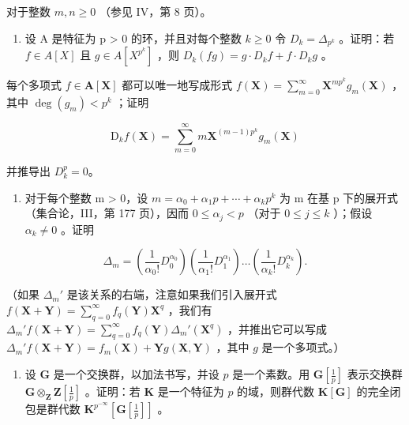 对于整数 \(m, n \geqslant 0\) （参见 IV，第 8 页）。

\begin{enumerate}
\def\labelenumi{\alph{enumi})}
\setcounter{enumi}{1}
\tightlist
\item
  设 A 是特征为 p \textgreater{} 0 的环，并且对每个整数 \(k \geqslant 0\) 令 \(D_{k} = \Delta_{p^{k}}\) 。证明：若 \(f \in A[X]\) 且 \(g \in A[X^{p^{k}}]\) ，则 \(D_{k}(fg) = g \cdot D_{k}f + f \cdot D_{k}g\) 。
\end{enumerate}

每个多项式 \(f \in \mathbf{A}[\mathbf{X}]\) 都可以唯一地写成形式 \(f(\mathbf{X}) = \sum_{m=0}^{\infty} \mathbf{X}^{mp^k} g_m(\mathbf{X})\) ，其中 \(\deg(g_m) < p^k\) ；证明

\[
\mathrm{D} _ {k} f (\mathbf {X}) = \sum_ {m = 0} ^ {\infty} m \mathbf {X} ^ {(m - 1) p ^ {k}} g _ {m} (\mathbf {X})
\]

并推导出 \(D_{k}^{p}=0\)。

\begin{enumerate}
\def\labelenumi{\alph{enumi})}
\setcounter{enumi}{2}
\tightlist
\item
  对于每个整数 m \textgreater{} 0，设 \(m = \alpha_{0} + \alpha_{1}p + \cdots + \alpha_{k}p^{k}\) 为 m 在基 p 下的展开式（集合论，III，第 177 页），因而 \(0 \leqslant \alpha_{j} < p\) （对于 \(0 \leqslant j \leqslant k\) ）；假设 \(\alpha_{k} \neq 0\) 。证明
\end{enumerate}

\[
\Delta_ {m} = \left(\frac {1}{\alpha_ {0} !} D _ {0} ^ {\alpha_ {0}}\right) \left(\frac {1}{\alpha_ {1} !} D _ {1} ^ {\alpha_ {1}}\right) \dots \left(\frac {1}{\alpha_ {k} !} D _ {k} ^ {\alpha_ {k}}\right).
\]

（如果 \(\Delta_m'\) 是该关系的右端，注意如果我们引入展开式 \(f(\mathbf{X} + \mathbf{Y}) = \sum_{q=0}^{\infty} f_q(\mathbf{Y}) \mathbf{X}^q\) ，我们有 \(\Delta_m' f(\mathbf{X} + \mathbf{Y}) = \sum_{q=0}^{\infty} f_q(\mathbf{Y}) \Delta_m'(\mathbf{X}^q)\) ，并推出它可以写成 \(\Delta_m' f(\mathbf{X} + \mathbf{Y}) = f_m(\mathbf{X}) + \mathbf{Y} g(\mathbf{X}, \mathbf{Y})\) ，其中 \(g\) 是一个多项式。）

\begin{enumerate}
\def\labelenumi{\arabic{enumi})}
\setcounter{enumi}{3}
\tightlist
\item
  设 \(\mathbf{G}\) 是一个交换群，以加法书写，并设 \(p\) 是一个素数。用 \(\mathbf{G}\left[\frac{1}{p}\right]\) 表示交换群 \(\mathbf{G} \otimes_{\mathbf{Z}} \mathbf{Z}\left[\frac{1}{p}\right]\) 。证明：若 \(\mathbf{K}\) 是一个特征为 \(p\) 的域，则群代数 \(\mathbf{K}[\mathbf{G}]\) 的完全闭包是群代数 \(\mathbf{K}^{p^{-\infty}}\left[\mathbf{G}\left[\frac{1}{p}\right]\right]\) 。
\end{enumerate}

